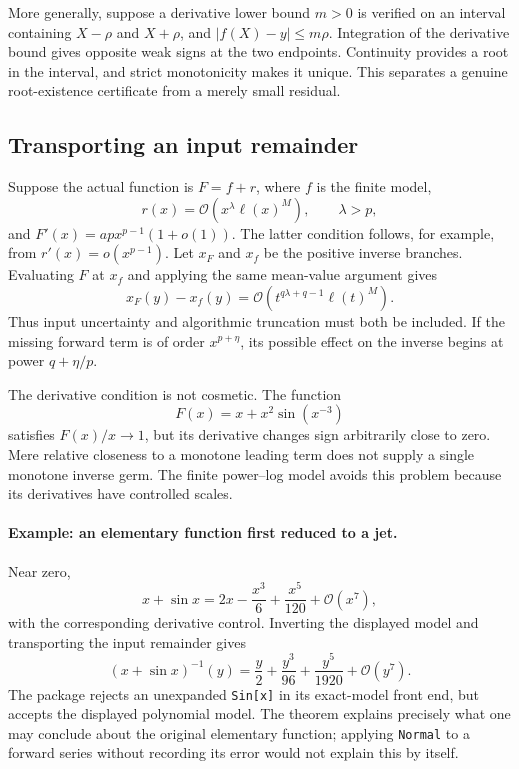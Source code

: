 \documentclass[11pt,a4paper]{article}
\numberwithin{equation}{section}
\theoremstyle{definition}
\newcommand{\OO}{\mathcal O}
\newcommand{\code}[1]{\texttt{#1}}
\begin{document}
More generally, suppose a derivative lower bound $m>0$ is verified on an
interval containing $X-\rho$ and $X+\rho$, and $|f(X)-y|\le m\rho$.
Integration of the derivative bound gives opposite weak signs at the two
endpoints. Continuity provides a root in the interval, and strict
monotonicity makes it unique. This separates a genuine root-existence
certificate from a merely small residual.

\subsection{Transporting an input remainder}\label{sec:input-error}
Suppose the actual function is $F=f+r$, where $f$ is the finite model,
\begin{equation}\label{eq:input-remainder}
 r(x)=\OO\!\left(x^\lambda\ell(x)^M\right),\qquad \lambda>p,
\end{equation}
and $F'(x)=apx^{p-1}(1+o(1))$. The latter condition follows, for example,
from $r'(x)=o(x^{p-1})$. Let $x_F$ and $x_f$ be the positive inverse
branches. Evaluating $F$ at $x_f$ and applying the same mean-value argument
gives
\begin{equation}\label{eq:input-transport}
 x_F(y)-x_f(y)=
 \OO\!\left(t^{q\lambda+q-1}\ell(t)^M\right).
\end{equation}
Thus input uncertainty and algorithmic truncation must both be included.
If the missing forward term is of order $x^{p+\eta}$, its possible effect
on the inverse begins at power $q+\eta/p$.

The derivative condition is not cosmetic. The function
\[
 F(x)=x+x^2\sin(x^{-3})
\]
satisfies $F(x)/x\to1$, but its derivative changes sign arbitrarily close
to zero. Mere relative closeness to a monotone leading term does not
supply a single monotone inverse germ. The finite power--log model avoids
this problem because its derivatives have controlled scales.

\paragraph{Example: an elementary function first reduced to a jet.}
Near zero,
\[
 x+\sin x=2x-\frac{x^3}{6}+\frac{x^5}{120}+\OO(x^7),
\]
with the corresponding derivative control. Inverting the displayed model
and transporting the input remainder gives
\[
 (x+\sin x)^{-1}(y)=\frac y2+\frac{y^3}{96}
                       +\frac{y^5}{1920}+\OO(y^7).
\]
The package rejects an unexpanded \code{Sin[x]} in its exact-model front
end, but accepts the displayed polynomial model. The theorem explains
precisely what one may conclude about the original elementary function;
applying \code{Normal} to a forward series without recording its error
would not explain this by itself.
\end{document}
